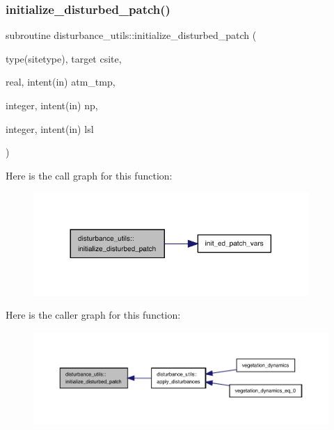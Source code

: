 \subsubsection{\texorpdfstring{initialize\+\_\+disturbed\+\_\+patch()}{initialize\_disturbed\_patch()}}
{\footnotesize\ttfamily subroutine disturbance\+\_\+utils\+::initialize\+\_\+disturbed\+\_\+patch (\begin{DoxyParamCaption}\item[{type(sitetype), target}]{csite,  }\item[{real, intent(in)}]{atm\+\_\+tmp,  }\item[{integer, intent(in)}]{np,  }\item[{integer, intent(in)}]{lsl }\end{DoxyParamCaption})}

Here is the call graph for this function\+:
\nopagebreak
\begin{figure}[H]
\begin{center}
\leavevmode
\includegraphics[width=296pt]{namespacedisturbance__utils_a31b6105dc67086438d6827bbffaf4bc4_cgraph}
\end{center}
\end{figure}
Here is the caller graph for this function\+:
\nopagebreak
\begin{figure}[H]
\begin{center}
\leavevmode
\includegraphics[width=350pt]{namespacedisturbance__utils_a31b6105dc67086438d6827bbffaf4bc4_icgraph}
\end{center}
\end{figure}
\mbox{\label{namespacedisturbance__utils_ac25d6a408136dff3bccca56269ca858f}} 
